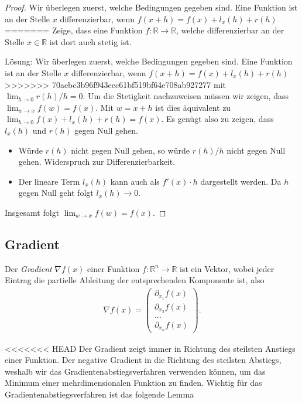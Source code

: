 \begin{proof}
Wir überlegen zuerst, welche Bedingungen gegeben sind. Eine Funktion ist an der Stelle $x$ differenzierbar, wenn $f(x+h)=f(x)+l_x(h)+ r(h)$  
=======
Zeige, dass eine Funktion $f:\mathbb{R} \rightarrow \mathbb{R}$, welche differenzierbar an der Stelle $x \in \mathbb{R}$ ist dort auch stetig ist.

Lösung: Wir überlegen zuerst, welche Bedingungen gegeben sind. Eine Funktion ist an der Stelle $x$ differenzierbar, wenn $f(x+h)=f(x)+l_x(h)+ r(h)$  
>>>>>>> 70aebc3b96f943eec61bf519bf64e708ab927277
mit $\lim_{h \rightarrow 0} r(h)/h= 0$. Um die Stetigkeit nachzuweisen müssen wir zeigen, dass $\lim_{w \rightarrow x} f(w)=f(x)$. Mit $w = x+h$ ist dies äquivalent zu $\lim_{h \rightarrow 0} f(x)+l_x(h)+r(h)=f(x)$. Es genügt also zu zeigen, dass  $l_x(h)$ und $r(h)$ gegen Null gehen.
\begin{itemize}
  \item Würde $r(h)$ nicht gegen Null gehen, so würde $r(h)/h$ nicht gegen Null gehen. Widerspruch zur Differenzierbarkeit.
  \item Der lineare Term $l_x(h)$ kann auch als $f'(x) \cdot h$ dargestellt werden. Da $h$ gegen Null geht folgt $l_x(h)\rightarrow 0$.
\end{itemize}
Insgesamt folgt $\lim_{w\rightarrow x} f(w) = f(x)$.
\end{proof}

\subsection{Gradient}
\begin{Def}
Der \emph{Gradient} $\nabla f(x)$ einer Funktion $f:\mathbb{R}^n\rightarrow \mathbb{R}$ ist ein Vektor, wobei jeder Eintrag die partielle Ableitung der entsprechenden Komponente ist, also
\begin{equation*} \begin{split} \nabla f(x) = \left( \begin{array}{c}
\partial_{x_1} f(x) \\
\partial_{x_2} f(x) \\
... \\
\partial_{x_n} f(x)
\end{array}
\right).
\end{split} \end{equation*} 
\end{Def}
<<<<<<< HEAD
Der Gradient zeigt immer in Richtung des steilsten Anstiegs einer Funktion. Der negative Gradient in die Richtung des steilsten Abstiegs, weshalb wir das Gradientenabstiegsverfahren verwenden können, um das Minimum einer mehrdimensionalen Funktion zu finden. Wichtig für das Gradientenabstiegsverfahren ist das folgende Lemma

